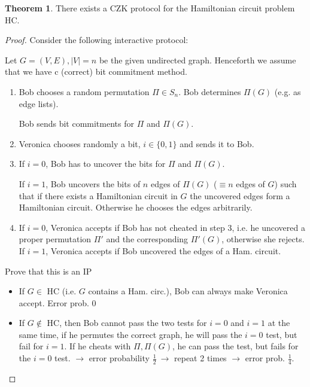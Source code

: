 \documentclass[11pt]{article}
\theoremstyle{definition}
\newtheorem{theorem}{Theorem}[section]
\theoremstyle{definition}
\begin{document}
\begin{theorem}

There exists a CZK protocol for the Hamiltonian circuit problem HC.

\end{theorem}

\begin{proof}

Consider the following interactive protocol:

Let $ G = (V, E), | V | = n $ be the given undirected graph. Henceforth we assume that we have c (correct) bit commitment method.

\begin{enumerate}
\item Bob chooses a random permutation $ \Pi \in S_n $. Bob determines $ \Pi(G) $ (e.g. as edge lists).

	Bob sends bit commitments for $ \Pi $ and $ \Pi(G) $.
\item Veronica chooses randomly a bit, $ i \in \{0, 1\} $ and sends it to Bob.

\item If $ i = 0 $, Bob has to uncover the bits for $ \Pi $ and $ \Pi(G) $.

	If $ i = 1 $, Bob uncovers the bits of $ n $ edges of $ \Pi(G) $ ($ \equiv n $ edges of $ G $) such that if there exists a Hamiltonian circuit in $ G $ the uncovered edges form a Hamiltonian circuit. Otherwise he chooses the edges arbitrarily.
	
\item If $ i = 0$, Veronica accepts if Bob has not cheated in step 3, i.e. he uncovered a proper permutation $ \Pi' $ and the corresponding $ \Pi'(G) $, otherwise she rejects. If $ i = 1 $, Veronica accepts if Bob uncovered the edges of a Ham. circuit.
\end{enumerate}

Prove that this is an IP
\begin{itemize}
\item If $ G \in $ HC (i.e. $ G $ contains a Ham. circ.), Bob can always make Veronica accept. Error prob. 0
\item If $ G \not \in $ HC, then Bob cannot pass the two tests for $ i = 0 $ and $ i = 1 $ at the same time, if he permutes the correct graph, he will pass the $ i = 0 $ test, but fail for $ i = 1 $. If he cheats with $ \Pi, \Pi(G) $, he can pass the test, but fails for the $ i = 0 $ test. $ \rightarrow $ error probability $ \frac{1}{2} ~ \rightarrow $ repeat 2 times $ \rightarrow $ error prob. $ \frac{1}{4} $.
\end{itemize}


\end{proof}
\end{document}
